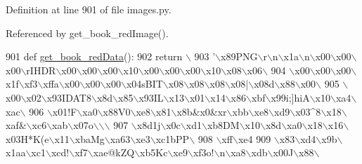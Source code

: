 Definition at line 901 of file images.\+py.



Referenced by get\+\_\+book\+\_\+red\+Image().


\begin{DoxyCode}
901 \textcolor{keyword}{def }\hyperlink{namespaceimages_a1d69045b3511549861c0100d3448f9a6}{get\_book\_redData}():
902     \textcolor{keywordflow}{return} \(\backslash\)
903 \textcolor{stringliteral}{'\(\backslash\)x89PNG\(\backslash\)r\(\backslash\)n\(\backslash\)x1a\(\backslash\)n\(\backslash\)x00\(\backslash\)x00\(\backslash\)x00\(\backslash\)rIHDR\(\backslash\)x00\(\backslash\)x00\(\backslash\)x00\(\backslash\)x10\(\backslash\)x00\(\backslash\)x00\(\backslash\)x00\(\backslash\)x10\(\backslash\)x08\(\backslash\)x06\(\backslash\)}
904 \textcolor{stringliteral}{\(\backslash\)x00\(\backslash\)x00\(\backslash\)x00\(\backslash\)x1f\(\backslash\)xf3\(\backslash\)xffa\(\backslash\)x00\(\backslash\)x00\(\backslash\)x00\(\backslash\)x04sBIT\(\backslash\)x08\(\backslash\)x08\(\backslash\)x08\(\backslash\)x08|\(\backslash\)x08d\(\backslash\)x88\(\backslash\)x00\(\backslash\)}
905 \textcolor{stringliteral}{\(\backslash\)x00\(\backslash\)x02\(\backslash\)x93IDAT8\(\backslash\)x8d\(\backslash\)x85\(\backslash\)x93IL\(\backslash\)x13\(\backslash\)x01\(\backslash\)x14\(\backslash\)x86\(\backslash\)xbf\(\backslash\)x99i;]hiA\(\backslash\)x10\(\backslash\)xa4\(\backslash\)xac\(\backslash\)}
906 \textcolor{stringliteral}{\(\backslash\)x01!F\(\backslash\)xa0\(\backslash\)x88V0\(\backslash\)xe8\(\backslash\)x81\(\backslash\)x8b&x0&xr\(\backslash\)xbb\(\backslash\)xe8\(\backslash\)xd9\(\backslash\)x03^8\(\backslash\)x18\(\backslash\)xaf&\(\backslash\)xc6\(\backslash\)xab\(\backslash\)x07o\(\backslash\)\(\backslash\)\(\backslash\)}
907 \textcolor{stringliteral}{\(\backslash\)x8d1j\(\backslash\)x0c\(\backslash\)xd1\(\backslash\)xb8DM\(\backslash\)x10\(\backslash\)x8d\(\backslash\)xa0\(\backslash\)x18\(\backslash\)x16\(\backslash\)x03H*K(e\(\backslash\)x11\(\backslash\)xbaMg\(\backslash\)xa63\(\backslash\)xe3\(\backslash\)xc1bPP\(\backslash\)}
908 \textcolor{stringliteral}{\(\backslash\)xff\(\backslash\)xe4%
909 \textcolor{stringliteral}{\(\backslash\)x83\(\backslash\)xd4\(\backslash\)x9b\(\backslash\)x1aa\(\backslash\)xc1\(\backslash\)xcd!\(\backslash\)xf7\(\backslash\)xae@kZQ\(\backslash\)xb5Kc\(\backslash\)xe9\(\backslash\)xf3o!\(\backslash\)n\(\backslash\)xa8\(\backslash\)xdb\(\backslash\)x00J\(\backslash\)x88\(\backslash\)}
}
\end{DoxyCode}
